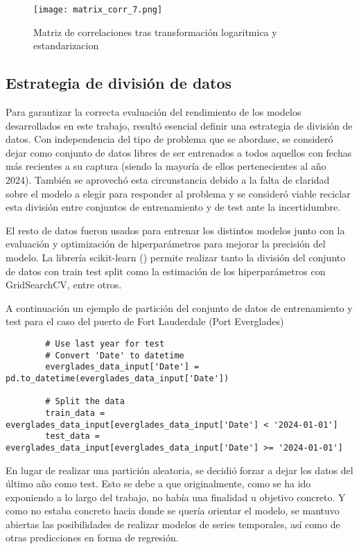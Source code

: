 \documentclass[12pt]{article}
\begin{document}
		\begin{figure}[H]
			\caption{\label{matrix_corr_7} Matriz de correlaciones tras transformación logaritmica y estandarizacion}
			\centering
			\hspace*{1cm}
			\texttt{[image: matrix\_corr\_7.png]}
		\end{figure}
	
	\subsection{\label{split}Estrategia de división de datos}
	Para garantizar la correcta evaluación del rendimiento de los modelos desarrollados en este trabajo, resultó esencial definir una estrategia de división de datos. Con independencia del tipo de problema que se abordase, se consideró dejar como conjunto de datos libres de ser entrenados a todos aquellos con fechas más recientes a su captura (siendo la mayoría de ellos pertenecientes al año 2024). También se aprovechó esta circunstancia debido a la falta de claridad sobre el modelo a elegir para responder al problema y se consideró viable reciclar esta división entre conjuntos de entrenamiento y de test ante la incertidumbre.
	
	El resto de datos fueron usados para entrenar los distintos modelos junto con la evaluación y optimización de hiperparámetros para mejorar la precisión del modelo. La librería scikit-learn (\cite{scikit-learn}) permite realizar tanto la división del conjunto de datos con train test split como la estimación de los hiperparámetros con GridSearchCV, entre otros.
	
	A continuación un ejemplo de partición del conjunto de datos de entrenamiento y test para el caso del puerto de Fort Lauderdale (Port Everglades)
	\begin{verbatim}
		# Use last year for test
		# Convert 'Date' to datetime
		everglades_data_input['Date'] = pd.to_datetime(everglades_data_input['Date'])
		
		# Split the data
		train_data = everglades_data_input[everglades_data_input['Date'] < '2024-01-01']
		test_data = everglades_data_input[everglades_data_input['Date'] >= '2024-01-01']
	\end{verbatim}

	En lugar de realizar una partición aleatoria, se decidió forzar a dejar los datos del último año como test. Esto se debe a que originalmente, como se ha ido exponiendo a lo largo del trabajo, no había una finalidad u objetivo concreto. Y como no estaba concreto hacia donde se quería orientar el modelo, se mantuvo abiertas las posibilidades de realizar modelos de series temporales, así como de otras predicciones en forma de regresión.
	
\end{document}
